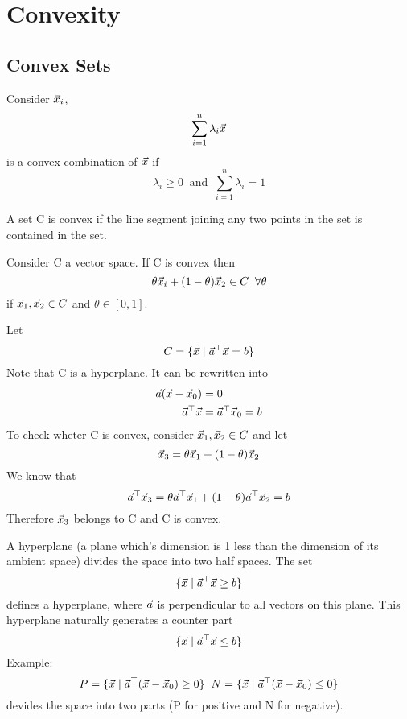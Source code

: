 \section{Convexity} %
\label{sec:convexity}

\subsection{Convex Sets} %
\label{sub:convex_sets}

\begin{definition}
	Consider $\vec{x}_i$,
	\[
\sum_{i=1}^n \lambda_i\vec{x}
	\]
	is a convex combination of $\vec{x}$ if 
	\[
\lambda_i\ge 0 \;\; \text{and} \;\; \sum_{i=1}^n \lambda_i = 1
	\]
\end{definition}

\begin{definition}
	A set C is convex if the line segment joining any two points in the set is contained in the set.
\end{definition}

\begin{example}
	Consider C a vector space. If C is convex then
	\[
\theta \vec{x}_i + (1-\theta)\vec{x}_2 \in C \;\;\forall \theta
	\]
	if $\vec{x}_1, \vec{x}_2 \in C$ and $\theta\in[0,1]$.
\end{example}

\begin{example}
	Let
	\[
C=\{\vec{x}\;|\;\vec{a}^\top\vec{x}=b\}	
	\]
	Note that C is a hyperplane. It can be rewritten into
	\begin{align*}
		\vec{a}(\vec{x}-\vec{x}_0) &= 0\\
		\vec{a}^\top\vec{x} &= \vec{a}^\top\vec{x}_0 =b
	\end{align*}
	To check wheter C is convex, consider $\vec{x}_1,\vec{x}_2\in C$ and let
	\[
\vec{x}_3 = \theta\vec{x}_1+(1-\theta)\vec{x}_2
	\]
	We know that
	\[
\vec{a}^\top\vec{x}_3 = \theta\vec{a}^\top\vec{x}_1 + (1-\theta)\vec{a}^\top\vec{x}_2 = b
	\]
	Therefore $\vec{x}_3$ belongs to C and C is convex.
\end{example}

\begin{remark}
	A hyperplane (a plane which's dimension is 1 less than the dimension of its ambient space) divides the space into two half spaces. The set
	\[
\{\vec{x}\;|\;\vec{a}^\top\vec{x}\ge b\}
	\]
	defines a hyperplane, where $\vec{a}$ is perpendicular to all vectors on this plane. This hyperplane naturally generates a counter part
	\[
\{\vec{x}\;|\;\vec{a}^\top\vec{x}\le b\}
	\]
	Example:
	\[
P = \{\vec{x}\;|\;\vec{a}^\top(\vec{x}-\vec{x}_0)\ge 0\} \;\; N = \{\vec{x}\;|\;\vec{a}^\top(\vec{x}-\vec{x}_0)\le 0\}
	\]
	devides the space into two parts (P for positive and N for negative).
\end{remark}

